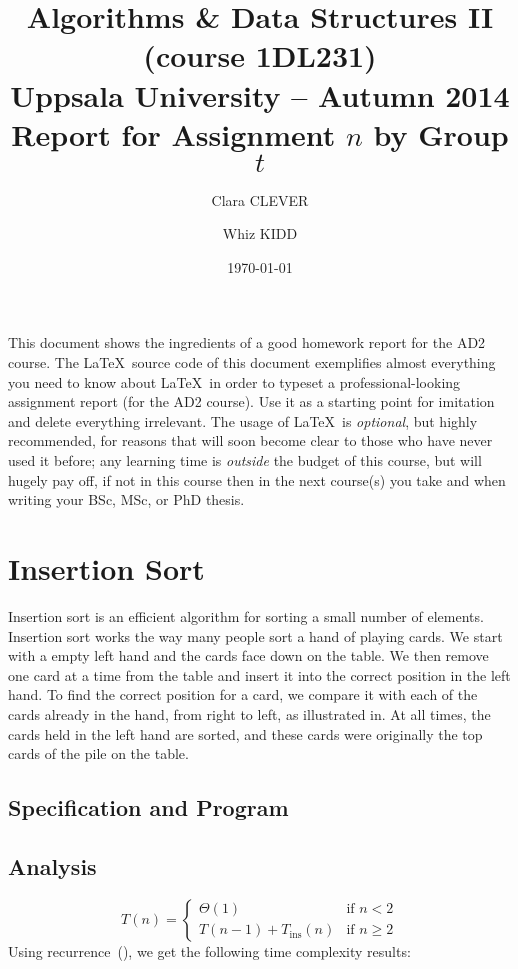 \documentclass[a4paper,11pt]{article}
\title{\textbf{Algorithms \& Data Structures II (course 1DL231) \\
    Uppsala University -- Autumn 2014 \\
    Report for Assignment $n$  %
    by Group $t$}}              %
\author{Clara CLEVER \and Whiz KIDD}  %
\date{\today}
\begin{document}
\maketitle

\noindent
This document shows the ingredients of a good homework report for the AD2 course.  The \LaTeX\ source code of this document exemplifies almost everything you need to know about \LaTeX\ in order to typeset a professional-looking assignment report (for the AD2 course).  Use it as a starting point for imitation and delete everything irrelevant.
The usage of \LaTeX\ is \emph{optional}, but highly recommended, for reasons that will soon become clear to those who have never used it before; any learning time is \emph{outside} the budget of this course, but will hugely pay off, if not in this course then in the next course(s) you take and when writing your BSc, MSc, or PhD thesis.

\section{Insertion Sort}
\label{sect:isort}

Insertion sort is an efficient algorithm for sorting a small number of
elements.  Insertion sort works the way many people sort a hand of
playing cards.  We start with a empty left hand and the cards face
down on the table.  We then remove one card at a time from the table
and insert it into the correct position in the left hand.  To find the
correct position for a card, we compare it with each of the cards
already in the hand, from right to left, as illustrated in.  At all times, the cards held in the left hand
are sorted, and these cards were originally the top cards of the pile
on the table.  

\subsection{Specification and Program}
\label{sect:pgm:isort}


\subsection{Analysis}
\label{sect:analysis:isort}

\begin{equation*}
  T(n) =
  \begin{cases}
    \Theta(1) & \text{if~} n < 2 \\
    T(n-1) + T_{\text{ins}}(n) & \text{if~} n \geq 2
  \end{cases}
\end{equation*}
Using recurrence~(), we get the following time complexity
results:
\end{document}

